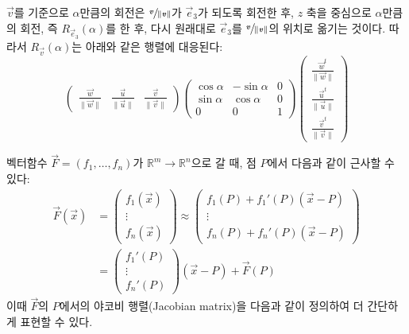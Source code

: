 \documentclass[../engineering_mathematics_lecture_note.tex]{subfiles}
\begin{document}
\begin{remark}
    $\vec v$를 기준으로 $\alpha$만큼의 회전은 $\sfrac{\bm{\mathit{v}}}{\lVert \bm{\mathit{v}}\rVert}$가 $\vec e_3$가 되도록 회전한 후, $z$ 축을 중심으로 $\alpha$만큼의 회전, 즉 $R_{\vec e_3}(\alpha)$를 한 후, 다시 원래대로 $\vec e_3$를 $\sfrac{\bm{\mathit{v}}}{\lVert \bm{\mathit{v}}\rVert}$의 위치로 옮기는 것이다.
    따라서 $R_{\vec v}(\alpha)$는 아래와 같은 행렬에 대응된다:
    \begin{equation*}
        \begin{pmatrix}
            \frac{\vec w}{\lVert \vec w \rVert} & \frac{\vec u}{\lVert \vec u \rVert} & \frac{\vec v}{\lVert \vec v \rVert}
        \end{pmatrix}
        \begin{pmatrix}
            \cos \alpha & -\sin \alpha & 0\\
            \sin \alpha & \cos \alpha & 0\\
            0 & 0 & 1
        \end{pmatrix}
        \begin{pmatrix}
            \frac{\vec w^t}{\lVert \vec w \rVert} \\ \frac{\vec u^t}{\lVert \vec u \rVert} \\ \frac{\vec v^t}{\lVert \vec v \rVert}
        \end{pmatrix}
    \end{equation*}
\end{remark}

벡터함수 $\vec F = (f_1, \dots, f_n)$가 $\mathbb R^m \rightarrow \mathbb R^n$으로 갈 때, 점 $P$에서 다음과 같이 근사할 수 있다:
\begin{align*}
    \vec F(\vec x) &=
    \begin{pmatrix}
        f_1(\vec x) \\ \vdots \\ f_n(\vec x)
    \end{pmatrix}
    \approx
    \begin{pmatrix}
        f_1(P) + f_1'(P) (\vec x - P)\\
        \vdots\\
        f_n(P) + f_n'(P) (\vec x - P)
    \end{pmatrix}\\
              &=
              \begin{pmatrix}
                  f_1'(P) \\ \vdots \\ f_n'(P)
              \end{pmatrix}
              (\vec x - P) + \vec F(P)
\end{align*}
이때 $\vec F$의 $P$에서의 야코비 행렬(Jacobian matrix)을 다음과 같이 정의하여 더 간단하게 표현할 수 있다.
\end{document}
